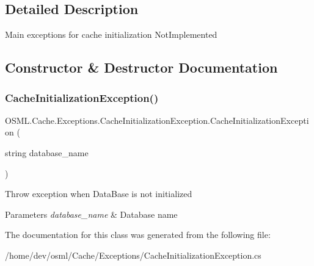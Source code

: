 \subsection{Detailed Description}
Main exceptions for cache initialization Not\+Implemented 



\subsection{Constructor \& Destructor Documentation}
\mbox{\label{classOSML_1_1Cache_1_1Exceptions_1_1CacheInitializationException_af144c4438d83d41d3bc5498cad749719}} 
\subsubsection{\texorpdfstring{CacheInitializationException()}{CacheInitializationException()}}
{\footnotesize\ttfamily O\+S\+M\+L.\+Cache.\+Exceptions.\+Cache\+Initialization\+Exception.\+Cache\+Initialization\+Exception (\begin{DoxyParamCaption}\item[{string}]{database\+\_\+name }\end{DoxyParamCaption})\hspace{0.3cm}{\ttfamily [inline]}}



Throw exception when Data\+Base is not initialized 


\begin{DoxyParams}{Parameters}
{\em database\+\_\+name} & Database name \\
\hline
\end{DoxyParams}


The documentation for this class was generated from the following file\+:\begin{DoxyCompactItemize}
\item 
/home/dev/osml/\+Cache/\+Exceptions/Cache\+Initialization\+Exception.\+cs\end{DoxyCompactItemize}
